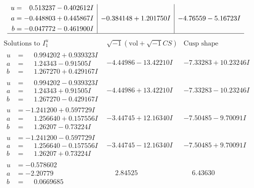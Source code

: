 \documentclass[1p]{elsarticle_modified}
\theoremstyle{definition}
\newcommand{\I}{\sqrt{-1}}
\begin{document}
$$\begin{array}{c|c|c}
\begin{aligned}
u &= \phantom{-}0.513237 - 0.402612 I \\
a &= -0.448803 + 0.445867 I \\
b &= -0.047772 - 0.461900 I\end{aligned}
 & -0.384148 + 1.201750 I & -4.76559 - 5.16723 I\\
 \hline 
 \end{array}$$\newpage$$\begin{array}{c|c|c}  
\text{Solutions to }I^u_{1}& \I (\text{vol} + \sqrt{-1}CS) & \text{Cusp shape}\\
 \hline 
\begin{aligned}
u &= \phantom{-}0.994202 + 0.939323 I \\
a &= \phantom{-}1.24343 - 0.91505 I \\
b &= \phantom{-}1.267270 + 0.429167 I\end{aligned}
 & -4.44986 - 13.42210 I & -7.33283 + 10.23246 I \\ \hline\begin{aligned}
u &= \phantom{-}0.994202 - 0.939323 I \\
a &= \phantom{-}1.24343 + 0.91505 I \\
b &= \phantom{-}1.267270 - 0.429167 I\end{aligned}
 & -4.44986 + 13.42210 I & -7.33283 - 10.23246 I \\ \hline\begin{aligned}
u &= -1.241200 + 0.597729 I \\
a &= \phantom{-}1.256640 + 0.157556 I \\
b &= \phantom{-}1.26207 - 0.73224 I\end{aligned}
 & -3.44745 + 12.16340 I & -7.50485 - 9.70091 I \\ \hline\begin{aligned}
u &= -1.241200 - 0.597729 I \\
a &= \phantom{-}1.256640 - 0.157556 I \\
b &= \phantom{-}1.26207 + 0.73224 I\end{aligned}
 & -3.44745 - 12.16340 I & -7.50485 + 9.70091 I \\ \hline\begin{aligned}
u &= -0.578602\phantom{ +0.000000I} \\
a &= -2.20779\phantom{ +0.000000I} \\
b &= \phantom{-}0.0669685\phantom{ +0.000000I}\end{aligned}
 & \phantom{-}2.84525\phantom{ +0.000000I} & \phantom{-}6.43630\phantom{ +0.000000I} \\ \hline\begin{aligned}

\end{aligned}
\end{array}$$
\end{document}
